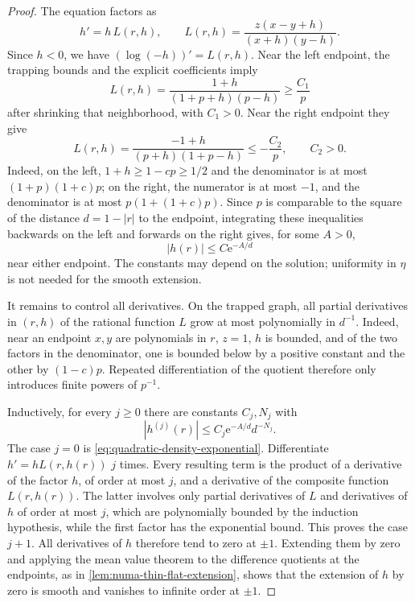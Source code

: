 \begin{proof}
The equation factors as
\begin{equation}\label{eq:quadratic-density-logarithm}
 h'=h\,L(r,h),\qquad
 L(r,h)=\frac{z(x-y+h)}{(x+h)(y-h)}.
\end{equation}
Since $h<0$, we have $(\log(-h))'=L(r,h)$. Near the left endpoint, the trapping bounds and the explicit coefficients imply
\[
 L(r,h)=\frac{1+h}{(1+p+h)(p-h)}\geq\frac{C_1}{p}
\]
after shrinking that neighborhood, with $C_1>0$. Near the right endpoint they give
\[
 L(r,h)=\frac{-1+h}{(p+h)(1+p-h)}\leq-\frac{C_2}{p},
 \qquad C_2>0.
\]
Indeed, on the left, $1+h\geq1-cp\geq1/2$ and the denominator is at most $(1+p)(1+c)p$; on the right, the numerator is at most $-1$, and the denominator is at most $p(1+(1+c)p)$. Since $p$ is comparable to the square of the distance $d=1-|r|$ to the endpoint, integrating these inequalities backwards on the left and forwards on the right gives, for some $A>0$,
\begin{equation}\label{eq:quadratic-density-exponential}
 |h(r)|\leq C \mathrm{e}^{-A/d}
\end{equation}
near either endpoint. The constants may depend on the solution; uniformity in $\eta$ is not needed for the smooth extension.

It remains to control all derivatives. On the trapped graph, all partial derivatives in $(r,h)$ of the rational function $L$ grow at most polynomially in $d^{-1}$. Indeed, near an endpoint $x,y$ are polynomials in $r$, $z=1$, $h$ is bounded, and of the two factors in the denominator, one is bounded below by a positive constant and the other by $(1-c)p$. Repeated differentiation of the quotient therefore only introduces finite powers of $p^{-1}$.

Inductively, for every $j\geq0$ there are constants $C_j,N_j$ with
\[
 |h^{(j)}(r)|\leq C_j \mathrm{e}^{-A/d}d^{-N_j}.
\]
The case $j=0$ is \eqref{eq:quadratic-density-exponential}. Differentiate $h'=hL(r,h(r))$ $j$ times. Every resulting term is the product of a derivative of the factor $h$, of order at most $j$, and a derivative of the composite function $L(r,h(r))$. The latter involves only partial derivatives of $L$ and derivatives of $h$ of order at most $j$, which are polynomially bounded by the induction hypothesis, while the first factor has the exponential bound. This proves the case $j+1$. All derivatives of $h$ therefore tend to zero at $\pm1$. Extending them by zero and applying the mean value theorem to the difference quotients at the endpoints, as in \cref{lem:numa-thin-flat-extension}, shows that the extension of $h$ by zero is smooth and vanishes to infinite order at $\pm1$.
\end{proof}

